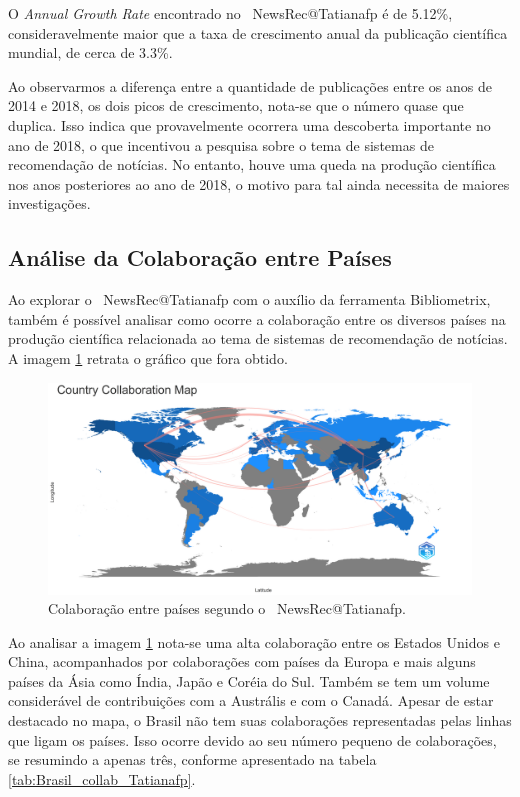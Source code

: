 O \textit{Annual Growth Rate} encontrado no \dataset\  NewsRec@Tatianafp é de 5.12\%, consideravelmente maior que a taxa de crescimento anual da publicação científica mundial, de cerca de 3.3\%.

Ao observarmos a diferença entre a quantidade de publicações entre os anos de 2014 e 2018, os dois picos de crescimento, nota-se que o número quase que duplica. Isso indica que provavelmente ocorrera uma descoberta importante no ano de 2018, o que incentivou a pesquisa sobre o tema de sistemas de recomendação de notícias. No entanto, houve uma queda na produção científica nos anos posteriores ao ano de 2018, o motivo para tal ainda necessita de maiores investigações.  

\subsection{Análise da Colaboração entre Países}

Ao explorar o \dataset\  NewsRec@Tatianafp com o auxílio da ferramenta Bibliometrix, também é possível analisar como ocorre a colaboração entre os diversos países na produção científica relacionada ao tema de sistemas de recomendação de notícias. A imagem \ref{fig:country_collab_NewsRec_Tatianafp} retrata o gráfico que fora obtido. 

\begin{figure}
    \centering
    \includegraphics[width=1\textwidth]{experiments/Tatianafp/PesquisaBibliometrica/images/CountryCollaborationMap.png}
    \caption{Colaboração entre países segundo o \dataset\  NewsRec@Tatianafp.}
    \label{fig:country_collab_NewsRec_Tatianafp}
\end{figure}

Ao analisar a imagem \ref{fig:country_collab_NewsRec_Tatianafp} nota-se uma alta colaboração entre os Estados Unidos e China, acompanhados por colaborações com países da Europa e mais alguns países da Ásia como Índia, Japão e Coréia do Sul. Também se tem um volume considerável de contribuições com a Austrális e com o Canadá. Apesar de estar destacado no mapa, o Brasil não tem suas colaborações representadas pelas linhas que ligam os países. Isso ocorre devido ao seu número pequeno de colaborações, se resumindo a apenas três, conforme apresentado na tabela \ref{tab:Brasil_collab_Tatianafp}. 

